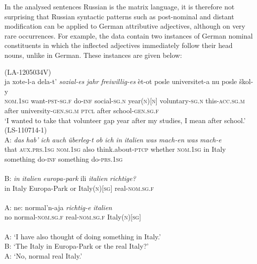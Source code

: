 In the analysed sentences Russian is the matrix language, it is therefore not surprising that Russian syntactic patterns such as post-nominal and distant modification can be applied to German attributive adjectives, although on very rare occurrences. For example, the data contain two instances of German nominal constituents in which the inflected adjectives immediately follow their head nouns, unlike in German. These instances are given below:

\ea
\label{ex:4:29}
(LA-1205034V)\\
 \gll ja xote-l-a dela-t' \textit{sozial-es} \textit{jahr} \textit{freiwillig-es}  èt-ot posle universitet-a nu posle škol-y\\
	\textsc{nom.1sg} want-\textsc{pst-sg.f} do-\textsc{inf} social-\textsc{sg.n} year(\textsc{n})[\textsc{n}] voluntary-\textsc{sg.n} this-\textsc{acc.sg.m} after university-\textsc{gen.sg.m} \textsc{ptcl} after school-\textsc{gen.sg.f}\\
\glt `I wanted to take that volunteer gap year after my studies, I mean after school.'
\ex
\label{ex:4:30}
(LS-110714-1)\\
 \gll A: \textit{das} \textit{hab'} \textit{ich} \textit{auch} \textit{überleg-t} \textit{ob} \textit{ich} \textit{in} \textit{italien} \textit{was} \textit{mach-en}  \textit{was} \textit{mach-e}\\
	{} that \textsc{aux.prs.1sg} \textsc{nom.1sg} also think.about-\textsc{ptcp} whether \textsc{nom.1sg} in Italy something do-\textsc{inf} something do-\textsc{prs.1sg}\\ 
\glt \hfill \\ 
 \gll B: \textit{in} \textit{italien} \textit{europa-park}  ili \textit{italien} \textit{richtige?}\\
	{} in Italy Europa-Park or Italy(\textsc{n})[\textsc{sg}] real-\textsc{nom.sg.f}\\
	\glt \hfill \\
\gll A: ne: normal'n-aja \textit{richtig-e} \textit{italien}\\
	{}  no normal-\textsc{nom.sg.f} real-\textsc{nom.sg.f} Italy(\textsc{n})[\textsc{sg}]\\
\glt \hfill \\

A: `I have also thought of doing something in Italy.'\\
B: `The Italy in Europa-Park or the  real Italy?'\\
A: `No, normal real Italy.'
\z

